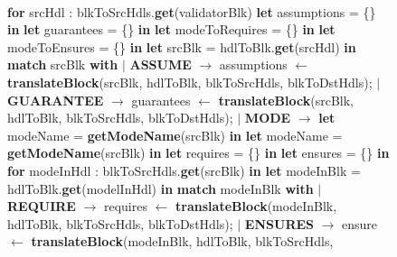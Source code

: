 \documentclass{article}
\begin{document}
\begin{figure}
\begin{algorithmic}
\\
\State \textbf{for} srcHdl : blkToSrcHdls.\textbf{get}(validatorBlk)
\State {\ \ \ \ } \textbf{let} assumptions = \{\} \textbf{in}
\State {\ \ \ \ } \textbf{let} guarantees = \{\} \textbf{in}
\State {\ \ \ \ } \textbf{let} modeToRequires = \{\} \textbf{in}
\State {\ \ \ \ } \textbf{let} modeToEnsures = \{\} \textbf{in}
\State {\ \ \ \ } \textbf{let} srcBlk = hdlToBlk.\textbf{get}(srcHdl) \textbf{in}
\State {\ \ \ \ } \textbf{match} srcBlk \textbf{with}
\State {\ \ \ \ } $\mid$ \textbf{ASSUME} $\rightarrow$ assumptions $\leftarrow$ \textbf{translateBlock}(srcBlk, hdlToBlk, blkToSrcHdls, blkToDstHdls);
\State {\ \ \ \ } $\mid$ \textbf{GUARANTEE} $\rightarrow$ guarantees $\leftarrow$ \textbf{translateBlock}(srcBlk, hdlToBlk, blkToSrcHdls, 
\State {\ \ \ \ \ \ \ \ \ \ \ \ \ \ \ \ \ \ \ \ \ \ \ \ \ \ \ \ \ \ \ \ \ \ \ \ \ \ \ \ \ \ \ \ \ \ \ \ \ \ \ \ \ \ \ \ \ \ \ \ \ \ \ \ \ \ \ \ \ \ \ \ \ \ \ \ \ \ \ \ \ \ \ \ \  } blkToDstHdls);
\State {\ \ \ \ } $\mid$ \textbf{MODE} $\rightarrow$ \textbf{let} modeName = \textbf{getModeName}(srcBlk) \textbf{in}
\State {\ \ \ \ \ \ \ \ \ \ \ \ \ \ \ \ \ \ \ \ \ \ } \textbf{let} modeName = \textbf{getModeName}(srcBlk) \textbf{in}
\State {\ \ \ \ \ \ \ \ \ \ \ \ \ \ \ \ \ \ \ \ \ \ } \textbf{let} requires = \{\} \textbf{in}
\State {\ \ \ \ \ \ \ \ \ \ \ \ \ \ \ \ \ \ \ \ \ \ } \textbf{let} ensures = \{\} \textbf{in}
\State {\ \ \ \ \ \ \ \ \ \ \ \ \ \ \ \ \ \ \ \ \ \ } \textbf{for} modeInHdl : blkToSrcHdls.\textbf{get}(srcBlk) \textbf{in} 
\State {\ \ \ \ \ \ \ \ \ \ \ \ \ \ \ \ \ \ \ \ \ \ \ \ \ \ } \textbf{let} modeInBlk = hdlToBlk.\textbf{get}(modelInHdl) \textbf{in} 
\State {\ \ \ \ \ \ \ \ \ \ \ \ \ \ \ \ \ \ \ \ \ \ \ \ \ \ } \textbf{match} modeInBlk \textbf{with}
\State {\ \ \ \ \ \ \ \ \ \ \ \ \ \ \ \ \ \ \ \ \ \ \ \ \ \ \ \ \ \ } $\mid$ \textbf{REQUIRE} $\rightarrow$ requires $\leftarrow$ \textbf{translateBlock}(modeInBlk, hdlToBlk, blkToSrcHdls, 
\State {\ \ \ \ \ \ \ \ \ \ \ \ \ \ \ \ \ \ \ \ \ \ \ \ \ \ \ \ \ \ \ \ \ \ \ \ \ \ \ \ \ \ \ \ \ \ \ \ \ \ \ \ \ \ \ \ \ \ \ \ \ \ \ \ \ \ \ \ \ \ \ \ \ \ \ \ \ \ \ \ \ \ \ \ \ \ \ \ } blkToDstHdls);
\State {\ \ \ \ \ \ \ \ \ \ \ \ \ \ \ \ \ \ \ \ \ \ \ \ \ \ } $\mid$ \textbf{ENSURES} $\rightarrow$ ensure $\leftarrow$ \textbf{translateBlock}(modeInBlk, hdlToBlk, blkToSrcHdls, 

\end{algorithmic}
\end{figure}
\end{document}
